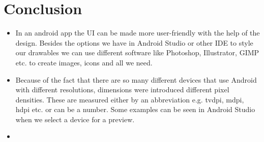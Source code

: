 \section*{Conclusion}

\begin{itemize}
	\item In an android app the UI can be made more user-friendly with the help of the design. Besides the options we have in Android Studio or other IDE to style our drawables we can use different software like Photoshop, Illustrator, GIMP etc. to create images, icons and all we need.
	\item Because of the fact that there are so many different devices that use Android with different resolutions, dimensions were introduced different pixel densities. These are measured either by an abbreviation e.g. tvdpi, mdpi, hdpi etc. or can be a number. Some examples can be seen in Android Studio when we select a device for a preview.
	\item  
\end{itemize}

\clearpage